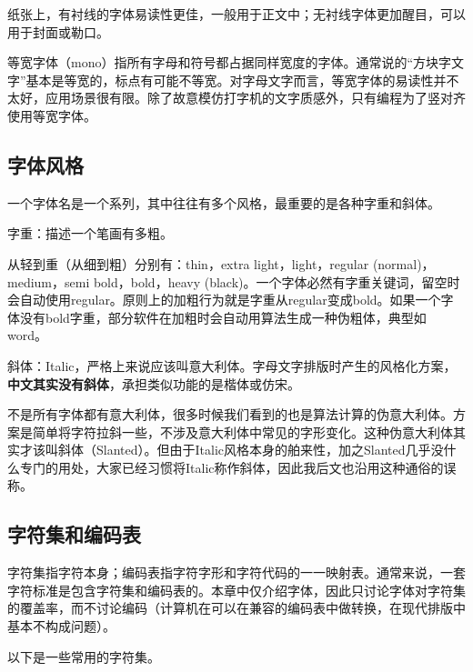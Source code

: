 \documentclass[10pt,openany]{book}
\begin{document}
\begin{sloppypar}
纸张上，有衬线的字体易读性更佳，一般用于正文中；无衬线字体更加醒目，可以用于封面或勒口。

等宽字体（mono）指所有字母和符号都占据同样宽度的字体。通常说的“方块字文字”基本是等宽的，标点有可能不等宽。对字母文字而言，等宽字体的易读性并不太好，应用场景很有限。除了故意模仿打字机的文字质感外，只有编程为了竖对齐使用等宽字体。

\subsection{字体风格}

一个字体名是一个系列，其中往往有多个风格，最重要的是各种字重和斜体。

字重：描述一个笔画有多粗。

从轻到重（从细到粗）分别有：thin，extra light，light，regular (normal)，medium，semi bold，bold，heavy (black)。一个字体必然有字重关键词，留空时会自动使用regular。原则上的加粗行为就是字重从regular变成bold。如果一个字体没有bold字重，部分软件在加粗时会自动用算法生成一种伪粗体，典型如word。

斜体：Italic，严格上来说应该叫意大利体。字母文字排版时产生的风格化方案，\textbf{中文其实没有斜体}，承担类似功能的是楷体或仿宋。

不是所有字体都有意大利体，很多时候我们看到的也是算法计算的伪意大利体。方案是简单将字符拉斜一些，不涉及意大利体中常见的字形变化。这种伪意大利体其实才该叫斜体（Slanted）。但由于Italic风格本身的舶来性，加之Slanted几乎没什么专门的用处，大家已经习惯将Italic称作斜体，因此我后文也沿用这种通俗的误称。

\subsection{字符集和编码表}

字符集指字符本身；编码表指字符字形和字符代码的一一映射表。通常来说，一套字符标准是包含字符集和编码表的。本章中仅介绍字体，因此只讨论字体对字符集的覆盖率，而不讨论编码（计算机在可以在兼容的编码表中做转换，在现代排版中基本不构成问题）。

以下是一些常用的字符集。


\end{sloppypar}
\end{document}
